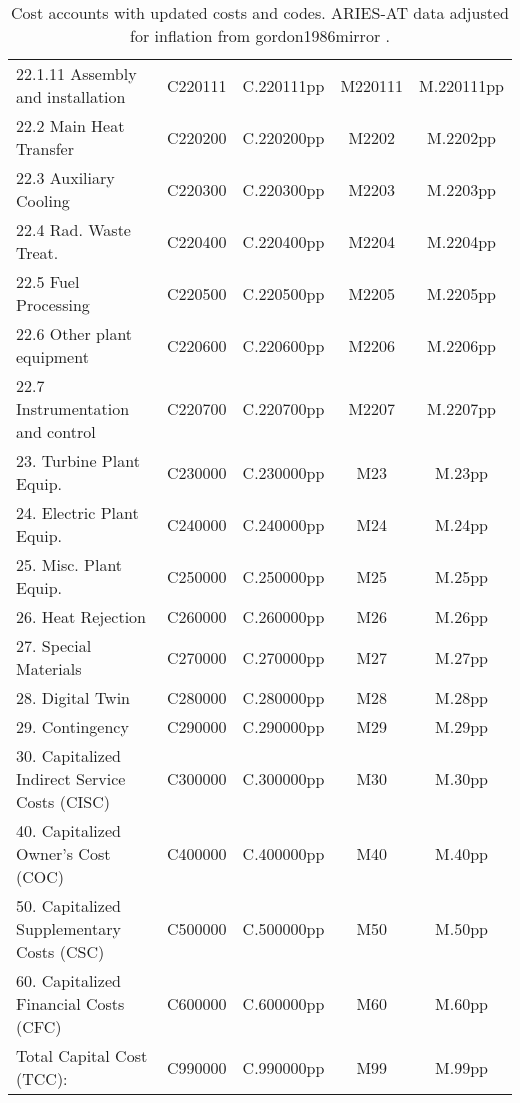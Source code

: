 \begin{table}[h!]
{\begin{tabular}{lcccc}
\hspace{15mm}22.1.11 Assembly and installation & C220111 & C.220111pp & M220111 & M.220111pp \\
\hspace{10mm}22.2 Main Heat Transfer & C220200 & C.220200pp & M2202 & M.2202pp \\
\hspace{10mm}22.3 Auxiliary Cooling & C220300 & C.220300pp & M2203 & M.2203pp \\
\hspace{10mm}22.4 Rad. Waste Treat. & C220400 & C.220400pp & M2204 & M.2204pp \\
\hspace{10mm}22.5 Fuel Processing & C220500 & C.220500pp & M2205 & M.2205pp \\
\hspace{10mm}22.6 Other plant equipment & C220600 & C.220600pp & M2206 & M.2206pp \\
\hspace{10mm}22.7 Instrumentation and control & C220700 & C.220700pp & M2207 & M.2207pp \\
\hspace{5mm}23. Turbine Plant Equip. & C230000 & C.230000pp & M23 & M.23pp \\
\hspace{5mm}24. Electric Plant Equip. & C240000 & C.240000pp & M24 & M.24pp \\
\hspace{5mm}25. Misc. Plant Equip. & C250000 & C.250000pp & M25 & M.25pp \\
\hspace{5mm}26. Heat Rejection & C260000 & C.260000pp & M26 & M.26pp \\
\hspace{5mm}27. Special Materials & C270000 & C.270000pp & M27 & M.27pp \\
\hspace{5mm}28. Digital Twin & C280000 & C.280000pp & M28 & M.28pp \\
\hspace{5mm}29. Contingency & C290000 & C.290000pp & M29 & M.29pp \\
30. Capitalized Indirect Service Costs (CISC) & C300000 & C.300000pp & M30 & M.30pp \\
40. Capitalized Owner’s Cost (COC) & C400000 & C.400000pp & M40 & M.40pp \\
50. Capitalized Supplementary Costs (CSC) & C500000 & C.500000pp & M50 & M.50pp \\
60. Capitalized Financial Costs (CFC) & C600000 & C.600000pp & M60 & M.60pp \\
\hline
Total Capital Cost (TCC): & C990000 & C.990000pp & M99 & M.99pp \\
\hline
\end{tabular}
}
\caption{Cost accounts with updated costs and codes. ARIES-AT data adjusted for inflation from
gordon1986mirror %
.}
\label{tab:costs_updated_codes}
\end{table}



